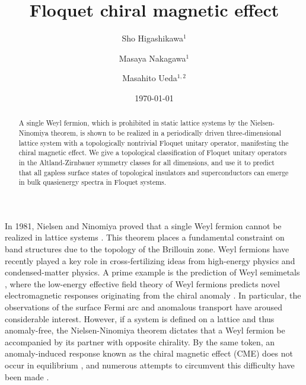 \documentclass[
floatfix,
pra,
twocolumn,
reprint,
amsmath,amssymb,
aps,
footnote,
]{revtex4}
\begin{document}


\title{Floquet chiral magnetic effect}
\author{Sho Higashikawa${}^1$}
\author{Masaya Nakagawa${}^1$}
\author{Masahito Ueda${}^{1,2}$}
\date{\today}

\begin{abstract}
A single Weyl fermion, which is prohibited in static lattice systems by the Nielsen-Ninomiya theorem, is shown to be realized in a periodically driven three-dimensional lattice system with a topologically nontrivial Floquet unitary operator, manifesting the chiral magnetic effect.
We give a topological classification of Floquet unitary operators in the Altland-Zirnbauer symmetry classes for all dimensions,
and use it to predict that all gapless surface states of topological insulators and superconductors can emerge in bulk quasienergy spectra in Floquet systems.
\end{abstract}
\maketitle


In 1981, Nielsen and Ninomiya proved that a single Weyl fermion cannot be realized in lattice systems \cite{NielsenNinomiya1, NielsenNinomiya2}. This theorem places a fundamental constraint on band structures due to the topology of the Brillouin zone.
Weyl fermions have recently played a key role in cross-fertilizing ideas from high-energy physics and condensed-matter physics.
A prime example is the prediction of Weyl semimetals \cite{Murakami07, Wan11}, where the low-energy effective field theory of Weyl fermions predicts novel electromagnetic responses originating from the chiral anomaly \cite{NielsenNinomiya3, Zyuzin12, Son12, Burkov14}.
In particular, the observations of the surface Fermi arc \cite{Lv15_1, SYXu15, Lv15_2, LXYang15, SYXu16, NXu16, SMHuang15} and anomalous transport \cite{XHuang15, Arnold16, Zhen16, ZhangHasan16} have aroused considerable interest.
However, if a system is defined on a lattice and thus anomaly-free, the Nielsen-Ninomiya theorem dictates that a Weyl fermion be accompanied by its partner with opposite chirality.
By the same token, an anomaly-induced response known as the chiral magnetic effect (CME) \cite{Fukushima08} does not occur in equilibrium \cite{Vazifeh13},
and numerous attempts to circumvent this difficulty have been made \cite{Goswami15, Taguchi16, Sumiyoshi16, Ibe17, Cortijo16, Pikulin16, MengT18, ChernodubM19}.
\end{document}
